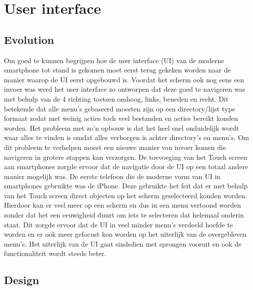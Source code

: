 ﻿\chapter{User interface}

\section{Evolution}

Om goed te kunnen begrijpen hoe de user interface (UI) van de moderne smartphone tot stand is gekomen moet eerst terug gekeken worden naar de manier waarop de UI eerst opgebouwd is. Voordat het scherm ook nog eens een invoer was werd het user interface zo ontworpen dat deze goed te navigeren was met behulp van de 4 richting toetsen omhoog, links, beneden en recht. Dit betekende dat alle menu's gebaseerd moesten zijn op een directory/lijst type formaat zodat met weinig acties toch veel bestanden en acties bereikt konden worden. Het probleem met zo’n opbouw is dat het heel snel onduidelijk wordt waar alles te vinden is omdat alles verborgen is achter directory's en menu's. Om dit probleem te verhelpen moest een nieuwe manier van invoer komen die navigeren in grotere stappen kan verzorgen. De toevoeging van het Touch screen aan smartphones zorgde ervoor dat de navigatie door de UI op een totaal andere manier mogelijk was. De eerste telefoon die de moderne vorm van UI in smartphones gebruikte was de iPhone. Deze gebruikte het feit dat er met behulp van het Touch screen direct objecten op het scherm geselecteerd konden worden. Hierdoor kan er veel meer op een scherm en dus in een menu vertoond worden zonder dat het een eeuwigheid duurt om iets te selecteren dat helemaal onderin staat. Dit zorgde ervoor dat de UI in veel minder menu’s verdeeld hoefde te worden en er ook meer gefocust kon worden op het uiterlijk van de overgebleven menu’s. Het uiterlijk van de UI gaat sindsdien met sprongen vooruit en ook de functionaliteit wordt steeds beter.

\section{Design}

